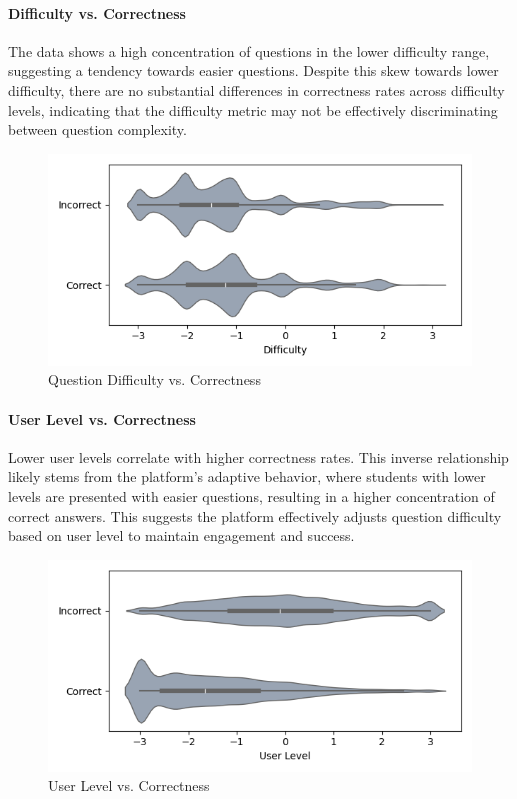 \documentclass[
    a4paper, %
    10pt, %
    twoside, %
]{LTJournalArticle}
\begin{document}
\paragraph{Difficulty vs. Correctness}
The data shows a high concentration of questions in the lower difficulty range, suggesting a tendency towards easier questions. Despite this skew towards lower difficulty, there are no substantial differences in correctness rates across difficulty levels, indicating that the difficulty metric may not be effectively discriminating between question complexity.
\begin{figure}[H]
    \centering
    \includegraphics[width=\columnwidth]{images/difficulty_vs_correctness.png}
    \caption{Question Difficulty vs. Correctness}
    \label{fig:difficulty-vs-correctness}
\end{figure}

\paragraph{User Level vs. Correctness}
Lower user levels correlate with higher correctness rates. This inverse relationship likely stems from the platform's adaptive behavior, where students with lower levels are presented with easier questions, resulting in a higher concentration of correct answers. This suggests the platform effectively adjusts question difficulty based on user level to maintain engagement and success.
\begin{figure}[H]
    \centering
    \includegraphics[width=\columnwidth]{images/user_level_vs_correctness.png}
    \caption{User Level vs. Correctness}
    \label{fig:user-level-vs-correctness}
\end{figure}
\end{document}
